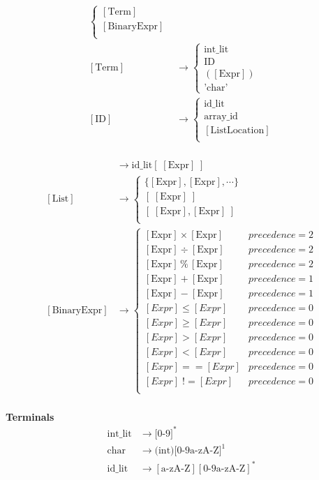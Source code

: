 \documentclass[11pt]{article}
\begin{document}
\begin{align*}
\begin{cases}
  [\text{Term}] \\ 
  [\text{BinaryExpr}] \\
  \end{cases} \\
  [\text{Term}] &\to
  \begin{cases}
    \text{int\_lit} \\ 
    \text{ID} \\ 
    \left([\text{Expr}]\right) \\
    \text{'char'} 
  \end{cases} \\
  [\text{ID}] &\to
  \begin{cases}
    \text{id\_lit} \\
    \text{array\_id} \\
    [\text{ListLocation}] \\
  \end{cases} \\
\end{align*}


\begin{align*}
  [\text{ListLocation}] &\to \text{id\_lit}[ \; [\text{Expr}] \; ]\\
  [\text{List}] &\to 
  \begin{cases}
    \{[\text{Expr}], [\text{Expr}], \cdots \} \\
    [\; [\text{Expr}] \;] \\
    [\; [\text{Expr}], [\text{Expr}] \;] \\
  \end{cases} \\
  [\text{BinaryExpr}] &\to 
  \begin{cases}
    [\text{Expr}] \times [\text{Expr}] & precedence = 2 \\
    [\text{Expr}] \div [\text{Expr}] & precedence = 2 \\
    [\text{Expr}] \,\%\, [\text{Expr}] & precedence = 2 \\
    [\text{Expr}] + [\text{Expr}] & precedence = 1 \\
    [\text{Expr}] - [\text{Expr}] & precedence = 1 \\
    [Expr] \le  [Expr] & precedence = 0 \\
    [Expr] \ge  [Expr] & precedence = 0 \\
    [Expr] >  [Expr] & precedence = 0 \\
    [Expr] <  [Expr] & precedence = 0 \\
    [Expr] ==  [Expr] & precedence = 0 \\
    [Expr] \; ! \!=  [Expr] & precedence = 0 \\
  \end{cases} \\
\end{align*}


\textbf{Terminals}
\begin{align*}
  \text{int\_lit} &\to \text{[0-9]}^* \\
  \text{char} &\to \text{(int)[0-9a-zA-Z]}^1 \\
  \text{id\_lit} &\to [\text{a-zA-Z}][\text{0-9a-zA-Z}]^* \\
\end{align*}
\end{document}
